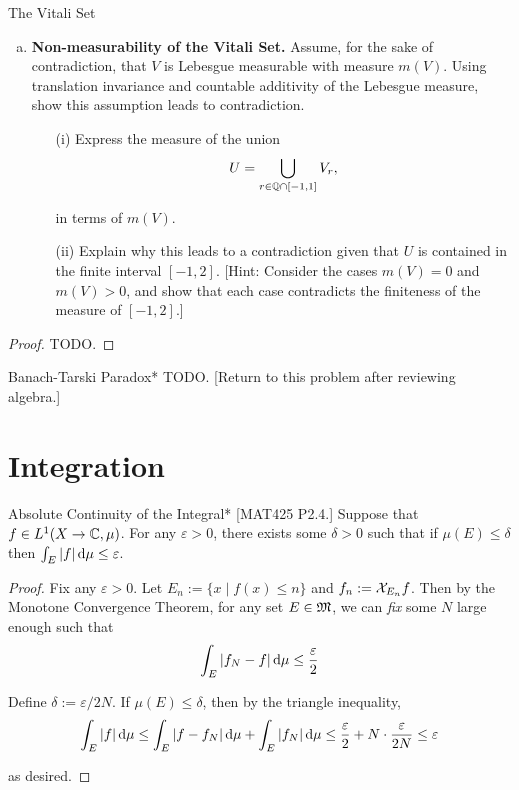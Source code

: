 \begin{problem}{The Vitali Set}
\begin{enumerate}[(a)]
        [Hint: If \(v \in V \subset [0,1]\) and \(r \in [-1,1]\), then \(v + r \in [-1,2]\).] 
        \item \textbf{Non-measurability of the Vitali Set.} Assume, for the sake of contradiction, that \(V\) is Lebesgue measurable with measure \(m(V)\). Using translation invariance and countable additivity of the Lebesgue measure, show this assumption leads to contradiction.
        \begin{itemize}
            \item[(i)] Express the measure of the union
            \[
                U = \bigcup_{r \in \mathbb{Q} \cap [-1,1]} V_r,
            \]

            in terms of \(m(V)\).
            \item[(ii)] Explain why this leads to a contradiction given that \(U\) is contained in the finite interval \([-1,2]\). [Hint: Consider the cases \(m(V) = 0\) and \(m(V) > 0\), and show that each case contradicts the finiteness of the measure of \([-1,2]\).]
        \end{itemize}
    \end{enumerate}
\end{problem}

\begin{proof}
    TODO. 
\end{proof}

\begin{problem}{Banach-Tarski Paradox}*
    TODO. [Return to this problem after reviewing algebra.]
\end{problem}

\newpage
\section{Integration}

\begin{problem}{Absolute Continuity of the Integral}*
    [MAT425 P2.4.] Suppose that \(f \in L^1(X \to \mathbb{C}, \mu)\). For any \(\varepsilon > 0\), there exists some \(\delta > 0\) such that if \(\mu(E) \leq \delta\) then \(\int_E |f| \, \mathrm{d}\mu \leq \varepsilon\). 
\end{problem}

\begin{proof}
    Fix any \(\varepsilon > 0\). Let \(E_n := \{x \mid f(x) \leq n\}\) and \(f_n := \mathcal{X}_{E_n}f\). Then by the Monotone Convergence Theorem, for any set \(E \in \mathfrak{M}\), we can \textit{fix} some \(N\) large enough such that
    \[
    \int_E |f_N - f| \, \mathrm{d}\mu \leq \frac{\varepsilon}{2}
    \]

    Define \(\delta := \varepsilon / 2N\). If \(\mu(E) \leq \delta\), then by the triangle inequality, 
    \[
    \int_E |f| \, \mathrm{d}\mu 
    \leq \int_E |f - f_N| \, \mathrm{d}\mu + \int_E |f_N| \, \mathrm{d}\mu
    \leq \frac{\varepsilon}{2} + N \cdot \frac{\varepsilon}{2N}
    \leq \varepsilon
    \]

    as desired. 
\end{proof}

